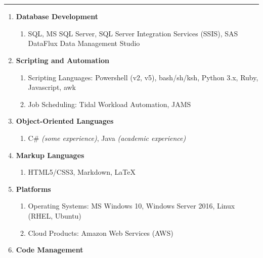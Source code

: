 \documentclass[11pt]{article}
\newcommand{\uppr}[3]{ \noindent\MakeUppercase{{\fontsize{#2}{#3} \selectfont {#1}}} }
\begin{document}
\section*{\uppr{Technical Strengths}{14}{16}} \noindent\rule{1.0\textwidth}{0.4pt}
\setlength{\leftmargini}{0pt}
\begin{enumerate}[topsep=0pt, partopsep=0pt, label=\null]

\item \textbf{Database Development}
  \begin{enumerate}[topsep=0pt, partopsep=0pt, label=\null]
  \item SQL, MS SQL Server, SQL Server Integration Services (SSIS), SAS DataFlux Data Management Studio
  \end{enumerate}
\item \textbf{Scripting and Automation}
  \begin{enumerate}[topsep=0pt, partopsep=0pt, label=\null]
  \item Scripting Languages: Powershell (v2, v5), bash/sh/ksh, Python 3.x, Ruby, Javascript, awk
  \item Job Scheduling: Tidal Workload Automation, JAMS
  \end{enumerate}
\item \textbf{Object-Oriented Languages}
  \begin{enumerate}[topsep=0pt, partopsep=0pt, label=\null]
  \item C\# \textit{(some experience)}, Java \textit{(academic experience)}
  \end{enumerate}
\item \textbf{Markup Languages}
  \begin{enumerate}[topsep=0pt, partopsep=0pt, label=\null]
  \item HTML5/CSS3, Markdown, {\LaTeX}
  \end{enumerate}
\item \textbf{Platforms}
  \begin{enumerate}[topsep=0pt, partopsep=0pt, label=\null]
  \item Operating Systems: MS Windows 10, Windows Server 2016, Linux (RHEL, Ubuntu)
  \item Cloud Products: Amazon Web Services (AWS)
  \end{enumerate}
\item \textbf{Code Management}
  \begin{enumerate}[topsep=0pt, partopsep=0pt, label=\null]

\end{enumerate}
\end{enumerate}
\end{document}
